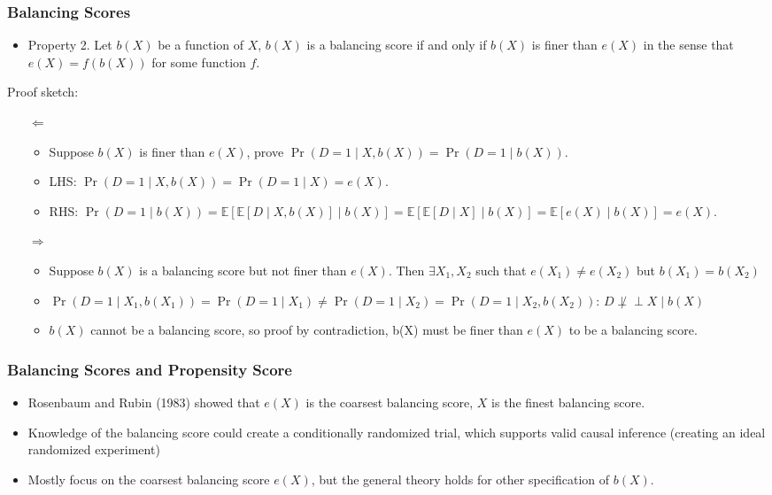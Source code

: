 \documentclass[10pt, handout]{beamer}
\newcommand{\ind}{\perp\!\!\!\!\perp}
\begin{document}
    
    \begin{frame}
      \frametitle{Balancing Scores}

      \begin{itemize}
        \item Property 2. Let $b(X)$ be a function of $X$, $b(X)$ is a balancing score if and only if $b(X)$ is finer than $e(X)$ in the sense that $e(X) = f(b(X))$ for some function $f$.
      \end{itemize}

      
      Proof sketch:
      \begin{enumerate}
        \item[$\Leftarrow$]
        \begin{itemize}
          \item Suppose $b(X)$ is finer than $e(X)$, prove $\Pr \left( D = 1 \mid X, b(X) \right) = \Pr \left( D = 1 \mid b(X) \right)$.
          \item LHS: $\Pr \left( D = 1 \mid X, b(X) \right) = \Pr \left( D = 1 \mid X \right) = e(X)$.
          \item RHS: $\Pr \left( D = 1 \mid b(X) \right) = \mathbb{E} \left[ \mathbb{E} \left[ D \mid X, b(X) \right] \mid b(X) \right] = \mathbb{E} \left[ \mathbb{E} \left[ D \mid X \right] \mid b(X) \right] = \mathbb{E}\left[ e(X) \mid b(X) \right] = e(X)$.
        \end{itemize}
        \item[$\Rightarrow$]
        \begin{itemize}
          \item Suppose $b(X)$ is a balancing score but not finer than $e(X)$. Then $\exists X_1, X_2$ such that $e(X_1) \neq e(X_2)$ but $b(X_1) = b(X_2)$
          \item $\Pr \left( D = 1 \mid X_1, b(X_1) \right) = \Pr \left( D = 1 \mid X_1 \right) \neq \Pr \left( D = 1 \mid X_2 \right) = \Pr \left( D = 1 \mid X_2, b(X_2) \right)$: $D \not\ind X \mid b(X)$
          \item $b(X)$ cannot be a balancing score, so proof by contradiction, b(X) must be finer than $e(X)$ to be a balancing score.
        \end{itemize}

      \end{enumerate}
    \end{frame}
    

    \begin{frame}
      \frametitle{Balancing Scores and Propensity Score}

      \begin{itemize}
        \item Rosenbaum and Rubin (1983) showed that $e(X)$ is the coarsest balancing score, $X$ is the finest balancing score.
        \item Knowledge of the balancing score could create a conditionally randomized trial, which supports valid causal inference (creating an ideal randomized experiment)
        \item Mostly focus on the coarsest balancing score $e(X)$, but the general theory holds for other specification of $b(X)$.
      \end{itemize}
    \end{frame}
\end{document}
